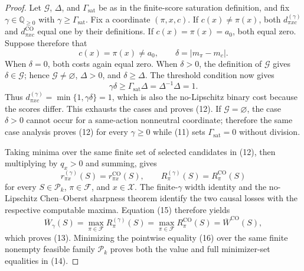\documentclass{article}
\begin{document}
\begin{proof}
Let \(\mathcal G\), \(\Delta\), and \(\Gamma_{\mathrm{sat}}\) be as in
the finite-score saturation definition, and fix
\(\gamma\in\mathbb Q_{\geq0}\) with
\(\gamma\geq\Gamma_{\mathrm{sat}}\).  Fix a coordinate
\((\pi,x,c)\).  If \(c(x)\neq\pi(x)\), both
\(d^{(\gamma)}_{\pi xc}\) and \(d^{\mathrm{CO}}_{\pi xc}\) equal one
by their definitions.  If \(c(x)=\pi(x)=a_0\), both equal zero.  Suppose
therefore that
\[
c(x)=\pi(x)\neq a_0,
\qquad \delta=|m_\pi-m_c|.
\]
When \(\delta=0\), both costs again equal zero.  When \(\delta>0\), the
definition of \(\mathcal G\) gives \(\delta\in\mathcal G\); hence
\(\mathcal G\neq\varnothing\), \(\Delta>0\), and
\(\delta\geq\Delta\).  The threshold condition now gives
\[
\gamma\delta\geq \Gamma_{\mathrm{sat}}\Delta
=\Delta^{-1}\Delta=1.
\]
Thus \(d^{(\gamma)}_{\pi xc}=\min\{1,\gamma\delta\}=1\), which is also
the no-Lipschitz binary cost because the scores differ.  This exhausts the
cases and proves (12).  If \(\mathcal G=\varnothing\), the case
\(\delta>0\) cannot occur for a same-action nonneutral coordinate;
therefore the same case analysis proves (12) for every \(\gamma\geq0\)
while (11) sets \(\Gamma_{\mathrm{sat}}=0\) without division.

Taking minima over the same finite set of selected candidates in (12),
then multiplying by \(q_x>0\) and summing, gives
\[
r^{(\gamma)}_{\pi x}(S)=r^{\mathrm{CO}}_{\pi x}(S),
\qquad
R^{(\gamma)}_\pi(S)=R^{\mathrm{CO}}_\pi(S)                           \tag{15}
\]
for every \(S\in\mathcal P_k\), \(\pi\in\mathcal F\), and
\(x\in\mathcal X\).  The finite-\(\gamma\) width identity and the
no-Lipschitz Chen--Oberst sharpness theorem identify the two causal losses
with the respective computable maxima.  Equation (15) therefore yields
\[
\overline W_\gamma(S)
=\max_{\pi\in\mathcal F}R^{(\gamma)}_\pi(S)
=\max_{\pi\in\mathcal F}R^{\mathrm{CO}}_\pi(S)
=\overline W^{\mathrm{CO}}(S),                                      \tag{16}
\]
which proves (13).  Minimizing the pointwise equality (16) over the same
finite nonempty feasible family \(\mathcal P_k\) proves both the value and
full minimizer-set equalities in (14).


\end{proof}
\end{document}
